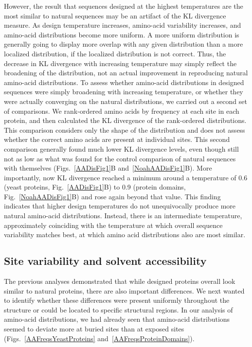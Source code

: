\documentclass[12pt]{article}
\begin{document}
However, the result that sequences designed at the highest temperatures are the most similar to natural sequences may be an artifact of the KL divergence measure. As design temperature increases, amino-acid variability increases, and amino-acid distributions become more uniform. A more uniform distribution is generally going to display more overlap with any given distribution than a more localized distribution, if the localized distribution is not correct. Thus, the decrease in KL divergence with increasing temperature may simply reflect the broadening of the distribution, not an actual improvement in reproducing natural amino-acid distributions. To assess whether amino-acid distributions in designed sequences were simply broadening with increasing temperature, or whether they were actually converging on the natural distributions, we carried out a second set of comparisons. We rank-ordered amino acids by frequency at each site in each protein, and then calculated the KL divergence of the rank-ordered distributions. This comparison considers only the shape of the distribution and does not assess whether the correct amino acids are present at individual sites. This second comparison generally found much lower KL divergence levels, even though still not as low as what was found for the control comparison of natural sequences with themselves (Figs.~\ref{AADisFig1}B and~\ref{NoahAADisFig1}B). More importantly, now KL divergence reached a minimum around a temperature of 0.6
(yeast proteins, Fig.~\ref{AADisFig1}B) to 0.9 (protein domains, Fig.~\ref{NoahAADisFig1}B) and rose again beyond that value. This finding indicates that higher design temperatures do not unequivocally produce more natural amino-acid distributions. Instead, there is an intermediate temperature, approximately coinciding with the temperature at which overall sequence variability matches best, at which amino acid distributions also are most similar.

\subsection{Site variability and solvent accessibility}
\label{ProteinStructure}

The previous analyses demonstrated that while designed proteins overall look similar to natural proteins, there are also important differences. We next wanted to identify whether these differences were present uniformly throughout the structure or could be located to specific structural regions. In our analysis of amino-acid distributions, we had already seen that amino-acid distributions seemed to deviate more at buried sites than at exposed sites (Figs.~\ref{AAFreqsYeastProteins} and~\ref{AAFreqsProteinDomains}).
\end{document}
